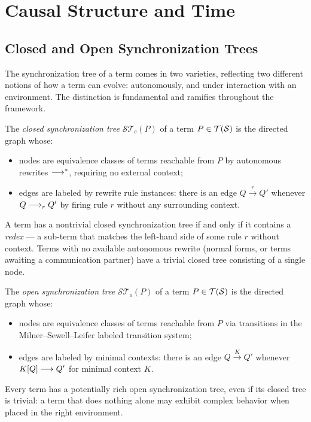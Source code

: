 \chapter{Causal Structure and Time}
\label{sec:causal}

\section{Closed and Open Synchronization Trees}

The synchronization tree of a term comes in two varieties,
reflecting two different notions of how a term can evolve:
autonomously, and under interaction with an environment.
The distinction is fundamental and ramifies throughout the framework.

\begin{definition}
The \emph{closed synchronization tree} $\mathcal{ST}_c(P)$ of a
term $P \in \mathcal{T}(\mathcal{S})$ is the directed graph whose:
\begin{itemize}[itemsep=2pt]
  \item nodes are equivalence classes of terms reachable from $P$
        by autonomous rewrites $\longrightarrow^*$, requiring no external
        context;
  \item edges are labeled by rewrite rule instances: there is an
        edge $Q \xrightarrow{r} Q'$ whenever $Q \longrightarrow_r Q'$
        by firing rule $r$ without any surrounding context.
\end{itemize}
A term has a nontrivial closed synchronization tree if and only if
it contains a \emph{redex} --- a sub-term that matches the
left-hand side of some rule $r$ without context.
Terms with no available autonomous rewrite (normal forms, or terms
awaiting a communication partner) have a trivial closed tree
consisting of a single node.
\end{definition}

\begin{definition}
The \emph{open synchronization tree} $\mathcal{ST}_o(P)$ of a
term $P \in \mathcal{T}(\mathcal{S})$ is the directed graph whose:
\begin{itemize}[itemsep=2pt]
  \item nodes are equivalence classes of terms reachable from $P$
        via transitions in the Milner--Sewell--Leifer labeled
        transition system;
  \item edges are labeled by minimal contexts: there is an edge
        $Q \xrightarrow{K} Q'$ whenever $K[Q] \longrightarrow Q'$ for
        minimal context $K$.
\end{itemize}
Every term has a potentially rich open synchronization tree,
even if its closed tree is trivial: a term that does nothing
alone may exhibit complex behavior when placed in the right
environment.
\end{definition}

